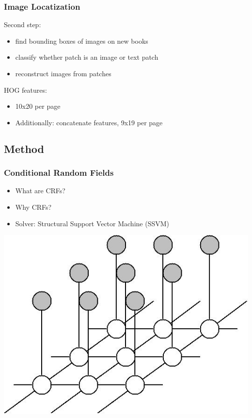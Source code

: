 
\begin{frame}
\frametitle{Image Locatization}
Second step:
\begin{itemize}
\item find bounding boxes of images on new books
\item classify whether patch is an image or text patch
\item reconstruct images from patches
\end{itemize}
HOG features:
\begin{itemize}
\item 10x20 per page
\item Additionally: concatenate features, 9x19 per page
\end{itemize}
\end{frame}

\subsection{Method}
\begin{frame}
\frametitle{Conditional Random Fields}
\begin{itemize}
\item What are CRFs?
\item Why CRFs?
\item Solver: Structural Support Vector Machine (SSVM)
\end{itemize}
\includegraphics[width=.5\paperwidth]{resources/crf}
\end{frame}

